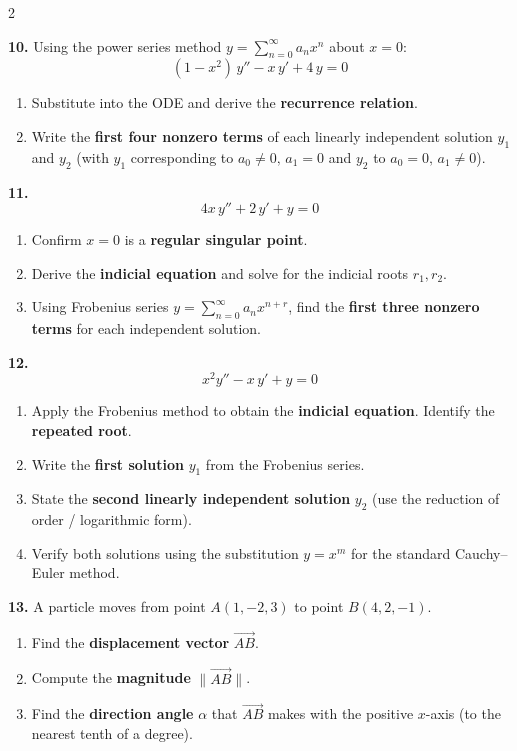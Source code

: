 \documentclass[a4paper,10pt]{article}
\begin{document}
\begin{multicols}{2}
    \medskip

    \textbf{10.} Using the power series method $y=\displaystyle\sum_{n=0}^{\infty}a_{n}x^{n}$ about $x=0$:
    \[
        (1-x^{2})\,y'' - x\,y' + 4\,y = 0
    \]
    \begin{enumerate}[label=(\alph*)]
        \item Substitute into the ODE and derive the \textbf{recurrence relation}.
        \item Write the \textbf{first four nonzero terms} of each linearly independent solution $y_{1}$ and $y_{2}$ (with $y_1$ corresponding to $a_0\neq 0,\,a_1=0$ and $y_2$ to $a_0=0,\,a_1\neq 0$).
    \end{enumerate}


    \medskip
    \textbf{11.}
    \[
        4x\,y'' + 2\,y' + y = 0
    \]
    \begin{enumerate}[label=(\alph*)]
        \item Confirm $x=0$ is a \textbf{regular singular point}.
        \item Derive the \textbf{indicial equation} and solve for the indicial roots $r_1, r_2$.
        \item Using Frobenius series $y=\displaystyle\sum_{n=0}^{\infty}a_n x^{n+r}$, find the \textbf{first three nonzero terms} for each independent solution.
    \end{enumerate}

    \medskip
    \noindent\textbf{12.}
    \[
        x^{2}y'' - x\,y' + y = 0
    \]
    \begin{enumerate}[label=(\alph*)]
        \item Apply the Frobenius method to obtain the \textbf{indicial equation}. Identify the \textbf{repeated root}.
        \item Write the \textbf{first solution} $y_1$ from the Frobenius series.
        \item State the \textbf{second linearly independent solution} $y_2$ (use the reduction of order / logarithmic form).
        \item Verify both solutions using the substitution $y=x^m$ for the standard Cauchy--Euler method.
    \end{enumerate}


    \vspace{3pt}

    \textbf{13.} A particle moves from point $A(1,-2,3)$ to point $B(4,2,-1)$.
    \begin{enumerate}[label=(\alph*)]
        \item Find the \textbf{displacement vector} $\overrightarrow{AB}$.
        \item Compute the \textbf{magnitude} $\|\overrightarrow{AB}\|$.
        \item Find the \textbf{direction angle} $\alpha$ that $\overrightarrow{AB}$ makes with the positive $x$-axis (to the nearest tenth of a degree).
    \end{enumerate}


\end{multicols}
\end{document}
